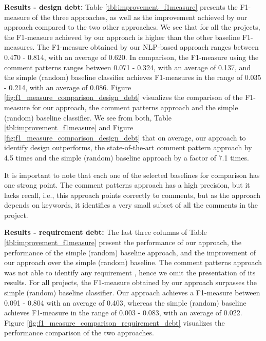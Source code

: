 \vspace{1mm}

\noindent \textbf{Results - design debt:} Table \ref{tbl:improvement_f1measure} presents the F1-measure of the three approaches, as well as the improvement achieved by our approach compared to the two other approaches. We see that for all the projects, the F1-measure achieved by our approach is higher than the other baseline F1-measures. The F1-measure obtained by our NLP-based approach ranges between 0.470 - 0.814, with an average of 0.620. In comparison, the F1-measure using the comment patterns ranges between 0.071 - 0.324, with an average of 0.137, and the simple (random) baseline classifier achieves F1-measures in the range of 0.035 - 0.214, with an average of 0.086. Figure \ref{fig:f1_measure_comparison_design_debt} visualizes the comparison of the F1-measure for our approach, the comment patterns approach and the simple (random) baseline classifier. We see from both, Table \ref{tbl:improvement_f1measure} and Figure \ref{fig:f1_measure_comparison_design_debt} that on average, our approach to identify design \SATD outperforms, the state-of-the-art comment pattern approach by 4.5 times and the simple (random) baseline approach by a factor of 7.1 times. 

It is important to note that each one of the selected baselines for comparison has one strong point. The comment patterns approach has a high precision, but it lacks recall, i.e., this approach points correctly to \SATD comments, but as the approach depends on keywords, it identifies a very small subset of all the \SATD comments in the project.


 
\noindent \textbf{Results - requirement debt:}  The last three columns of Table \ref{tbl:improvement_f1measure} present the performance of our approach, the performance of the simple (random) baseline approach, and the improvement of our approach over the simple (random) baseline. The comment patterns approach was not able to identify any requirement \SATD, hence we omit the presentation of its results. For all projects, the F1-measure obtained by our approach surpasses the simple (random) baseline classifier. Our approach achieves a F1-measure between 0.091 - 0.804 with an average of 0.403, whereas the simple (random) baseline achieves F1-measure in the range of 0.003 - 0.083, with an average of 0.022. Figure \ref{fig:f1_measure_comparison_requirement_debt} visualizes the performance comparison of the two approaches.

